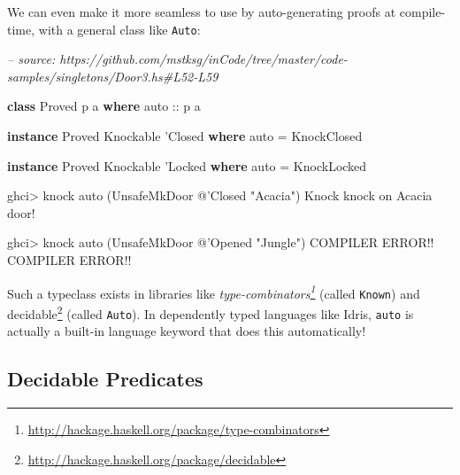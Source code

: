 \documentclass[]{article}
\newenvironment{Shaded}{}{}
\newcommand{\CommentTok}[1]{\textcolor[rgb]{0.38,0.63,0.69}{\textit{#1}}}
\newcommand{\DataTypeTok}[1]{\textcolor[rgb]{0.56,0.13,0.00}{#1}}
\newcommand{\FunctionTok}[1]{\textcolor[rgb]{0.02,0.16,0.49}{#1}}
\newcommand{\KeywordTok}[1]{\textcolor[rgb]{0.00,0.44,0.13}{\textbf{#1}}}
\newcommand{\NormalTok}[1]{#1}
\newcommand{\OtherTok}[1]{\textcolor[rgb]{0.00,0.44,0.13}{#1}}
\newcommand{\StringTok}[1]{\textcolor[rgb]{0.25,0.44,0.63}{#1}}
\renewcommand{\href}[2]{#2\footnote{\url{#1}}}
\begin{document}
We can even make it more seamless to use by auto-generating proofs at
compile-time, with a general class like \texttt{Auto}:

\begin{Shaded}
\begin{Highlighting}[]
\CommentTok{-- source: https://github.com/mstksg/inCode/tree/master/code-samples/singletons/Door3.hs#L52-L59}

\KeywordTok{class} \DataTypeTok{Proved}\NormalTok{ p a }\KeywordTok{where}
\OtherTok{    auto ::}\NormalTok{ p a}

\KeywordTok{instance} \DataTypeTok{Proved} \DataTypeTok{Knockable}\NormalTok{ '}\DataTypeTok{Closed} \KeywordTok{where}
\NormalTok{    auto }\FunctionTok{=} \DataTypeTok{KnockClosed}

\KeywordTok{instance} \DataTypeTok{Proved} \DataTypeTok{Knockable}\NormalTok{ '}\DataTypeTok{Locked} \KeywordTok{where}
\NormalTok{    auto }\FunctionTok{=} \DataTypeTok{KnockLocked}
\end{Highlighting}
\end{Shaded}

\begin{Shaded}
\begin{Highlighting}[]
\NormalTok{ghci}\FunctionTok{>}\NormalTok{ knock auto (}\DataTypeTok{UnsafeMkDoor} \FunctionTok{@}\NormalTok{'}\DataTypeTok{Closed} \StringTok{"Acacia"}\NormalTok{)}
\DataTypeTok{Knock}\NormalTok{ knock on }\DataTypeTok{Acacia}\NormalTok{ door}\FunctionTok{!}

\NormalTok{ghci}\FunctionTok{>}\NormalTok{ knock auto (}\DataTypeTok{UnsafeMkDoor} \FunctionTok{@}\NormalTok{'}\DataTypeTok{Opened} \StringTok{"Jungle"}\NormalTok{)}
\DataTypeTok{COMPILER} \DataTypeTok{ERROR}\FunctionTok{!!} \DataTypeTok{COMPILER} \DataTypeTok{ERROR}\FunctionTok{!!}
\end{Highlighting}
\end{Shaded}

Such a typeclass exists in libraries like
\emph{\href{http://hackage.haskell.org/package/type-combinators}{type-combinators}}
(called \texttt{Known}) and
\href{http://hackage.haskell.org/package/decidable}{decidable} (called
\texttt{Auto}). In dependently typed languages like Idris, \texttt{auto} is
actually a built-in language keyword that does this automatically!

\hypertarget{decidable-predicates}{%
\subsection{Decidable Predicates}\label{decidable-predicates}}
\end{document}
